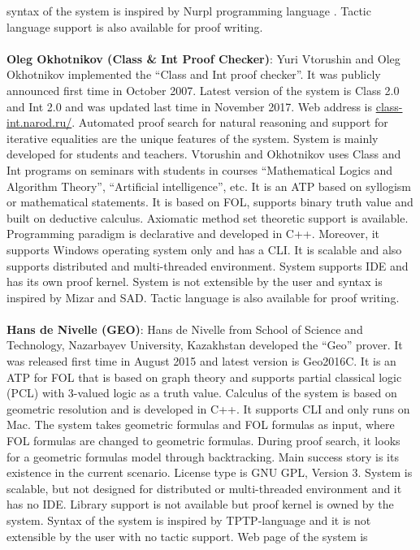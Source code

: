 syntax of the system is inspired by Nurpl programming language . Tactic language support is also available for proof writing.
\\\\
{\bf Oleg Okhotnikov (Class \& Int Proof Checker)}:
Yuri Vtorushin and Oleg Okhotnikov implemented the ``Class and Int proof checker''. 
It was publicly announced first time in October 2007. Latest version of the system is Class 2.0 and Int 2.0 and was updated last time in 
November 2017. Web address is \url{class-int.narod.ru/}. Automated proof search for natural reasoning and support for iterative equalities
are the unique features of the system. System is mainly developed for students and teachers. Vtorushin and Okhotnikov uses Class and Int programs 
on seminars with students in courses ``Mathematical Logics and Algorithm Theory'', ``Artificial intelligence'', etc. It is an ATP based on syllogism 
or mathematical statements. It is based on FOL, supports binary truth value and built on deductive 
calculus. Axiomatic method set theoretic support is available. Programming paradigm is declarative and developed in C++. 
Moreover, it supports Windows operating system only and has a CLI. It is scalable and also supports distributed and multi-threaded 
environment. System supports IDE and has its own proof kernel. System is not extensible by the user and syntax is inspired by Mizar and SAD. 
Tactic language is also available for proof writing.
\\\\
{\bf Hans de Nivelle (GEO)}:
Hans de Nivelle from School of Science and Technology, Nazarbayev University, Kazakhstan developed the ``Geo''  prover.
It was released first time in August 2015 and latest version is Geo2016C. 
It is an ATP for FOL that is based on graph theory and 
supports partial classical logic (PCL) with 3-valued logic as a truth value. Calculus of the system is based
on geometric resolution and is
developed in C++. It supports CLI and only runs on Mac. 
The system takes geometric formulas and FOL formulas as input, where FOL formulas are changed to geometric formulas. 
During proof search, it looks for a geometric formulas model through backtracking.
Main success story is its existence in the current scenario.
License type is GNU GPL, Version 3. System is scalable, but not designed for distributed or multi-threaded environment and it
has no IDE. Library support is not available but proof kernel is owned by the system. Syntax of the system is inspired by
TPTP-language and it is not extensible by the user with no tactic support. Web page of the system is 
